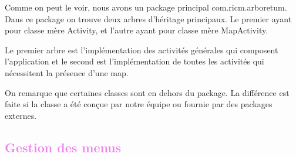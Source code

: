 \documentclass[a4paper,11pt]{article}
\begin{document}
    Comme on peut le voir, nous avons un package principal com.ricm.arboretum. Dans ce package on trouve deux arbres d'héritage principaux. Le premier 
    ayant pour classe mère Activity, et l'autre ayant pour classe mère MapActivity.
    
    Le premier arbre est l'implémentation des activités générales qui composent l'application et le second est l'implémentation de toutes les activités 
    qui nécessitent la présence d'une map.
    
    On remarque que certaines classes sont en dehors du package. La différence est faite si la classe a été conçue par notre équipe ou fournie par des packages externes.
      \newpage
    \textcolor{Violet}{\section{Gestion des menus}}
		
\end{document}

